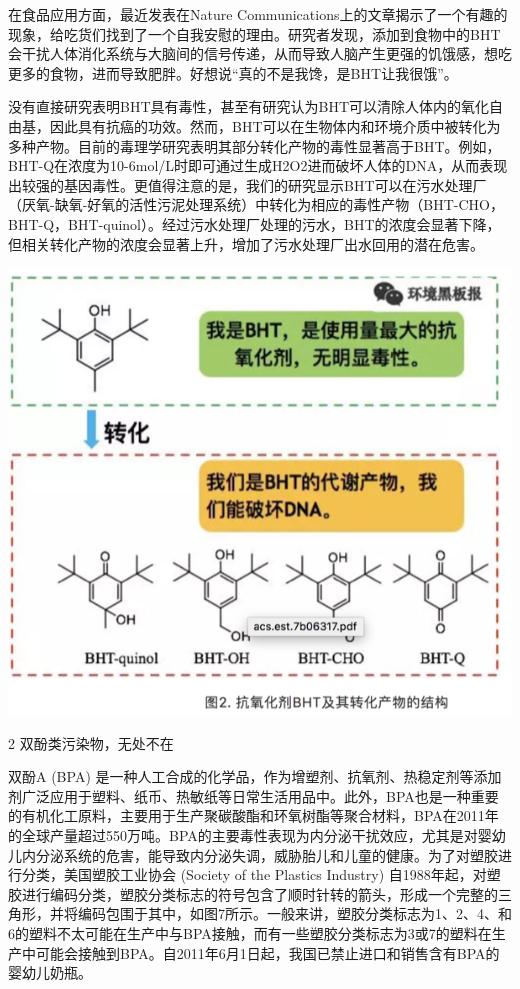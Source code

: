 \documentclass[]{book}
\begin{document}
在食品应用方面，最近发表在Nature Communications上的文章揭示了一个有趣的现象，给吃货们找到了一个自我安慰的理由。研究者发现，添加到食物中的BHT会干扰人体消化系统与大脑间的信号传递，从而导致人脑产生更强的饥饿感，想吃更多的食物，进而导致肥胖。好想说``真的不是我馋，是BHT让我很饿''。

没有直接研究表明BHT具有毒性，甚至有研究认为BHT可以清除人体内的氧化自由基，因此具有抗癌的功效。然而，BHT可以在生物体内和环境介质中被转化为多种产物。目前的毒理学研究表明其部分转化产物的毒性显著高于BHT。例如，BHT-Q在浓度为10-6mol/L时即可通过生成H2O2进而破坏人体的DNA，从而表现出较强的基因毒性。更值得注意的是，我们的研究显示BHT可以在污水处理厂（厌氧-缺氧-好氧的活性污泥处理系统）中转化为相应的毒性产物（BHT-CHO，BHT-Q，BHT-quinol）。经过污水处理厂处理的污水，BHT的浓度会显著下降，但相关转化产物的浓度会显著上升，增加了污水处理厂出水回用的潜在危害。

\includegraphics[width=8.33in]{images/epc2}

2 双酚类污染物，无处不在

双酚A (BPA) 是一种人工合成的化学品，作为增塑剂、抗氧剂、热稳定剂等添加剂广泛应用于塑料、纸币、热敏纸等日常生活用品中。此外，BPA也是一种重要的有机化工原料，主要用于生产聚碳酸酯和环氧树酯等聚合材料，BPA在2011年的全球产量超过550万吨。BPA的主要毒性表现为内分泌干扰效应，尤其是对婴幼儿内分泌系统的危害，能导致内分泌失调，威胁胎儿和儿童的健康。为了对塑胶进行分类，美国塑胶工业协会 (Society of the Plastics Industry) 自1988年起，对塑胶进行编码分类，塑胶分类标志的符号包含了顺时针转的箭头，形成一个完整的三角形，并将编码包围于其中，如图7所示。一般来讲，塑胶分类标志为1、2、4、和6的塑料不太可能在生产中与BPA接触，而有一些塑胶分类标志为3或7的塑料在生产中可能会接触到BPA。自2011年6月1日起，我国已禁止进口和销售含有BPA的婴幼儿奶瓶。
\end{document}
